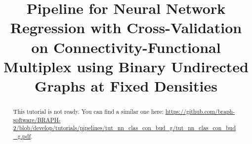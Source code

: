 \documentclass[justified]{tufte-handout}
\title[Regression Cross-Validation Connectivity-Functional Multiplex BUT]{Pipeline for Neural Network Regression with Cross-Validation on Connectivity-Functional Multiplex using Binary Undirected Graphs at Fixed Densities}
\begin{document}
\maketitle

\begin{abstract}
\noindent
This tutorial is not ready. You can find a similar one here: \url{https://github.com/braph-software/BRAPH-2/blob/develop/tutorials/pipelines/tut_nn_clas_con_bud_g/tut_nn_clas_con_bud_g.pdf}.
\end{abstract}
\end{document}
